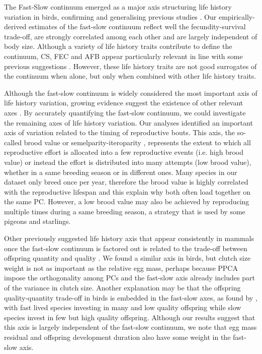 The Fast-Slow continuum emerged as a major axis structuring life history 
variation in birds, confirming and generalising previous studies
\citep{Saether1987,Gaillard1989,Saether2000,Jeschke2009}.
Our empirically-derived estimates of the fast-slow continuum reflect well the
fecundity-survival trade-off, are strongly correlated among each other and are 
largely independent of body size. Although a variety of life history traits 
contribute to define the continuum, CS, FEC and AFB appear particularly relevant in
line with some previous suggestions
\citep{Stearns1983a,Saether1987,Gaillard1989,Oli2004,Dobson2007,Jeschke2009}.
However, these life history traits are not good surrogates of the continuum
when alone, but only when combined with other life history traits.

Although the fast-slow continuum is widely considered the most important axis of 
life history variation, growing evidence suggest the existence of other relevant 
axes
\citep{Stearns1983a,Read1989,Gaillard1989,Promislow1990,Dobson2007,Bielby2007}.
By accurately quantifying the fast-slow continuum, we could investigate the
remaining axes of life history variation.
Our analyses identified an important axis of variation related to the timing of
reproductive bouts. This axis, the so-called brood value \citep{Bokony2009} or
semelparity-iteroparity \citep{Gaillard1989}, represents the extent to which
all reproductive effort is allocated into a few reproductive events (i.e. high
brood value) or instead the effort is distributed into many attempts (low brood
value), whether in a same breeding season or in different ones. Many species in
our dataset only breed once per year, therefore the brood value is highly
correlated with the reproductive lifespan and this explain why both often load
together on the same PC. However, a low brood value may also be achieved by
reproducing multiple times during a same breeding season, a strategy that is
used by some pigeons and starlings.

Other previously suggested life history axis that appear consistently in mammals
once the fast-slow continuum is factored out is related to the trade-off between
offspring quantity and quality \citep{Promislow1990,Bielby2007,Dobson2007}.
We found a similar axis in birds, but clutch size weight is not as important as
the relative egg mass, perhaps because PPCA impose the orthogonality among PCs
and the fast-slow axis already includes part of the variance in clutch size.
Another explanation may be that the offspring quality-quantity trade-off
in birds is embedded in the fast-slow axes, as found by \citet{Jeschke2009},
with fast lived species investing in many and low quality offspring while slow
species invest in few but high quality offspring. Although our results suggest
that this axis is largely independent of the fast-slow continuum, we note that
egg mass residual and offspring development duration also have some weight in
the fast-slow axis.

